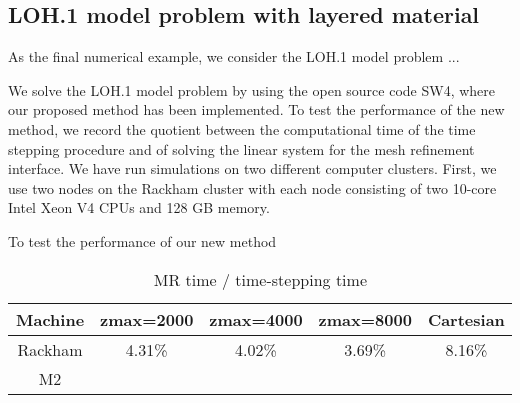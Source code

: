 \subsection{LOH.1 model problem with layered material}
As the final numerical example, we consider the LOH.1 model problem ...

We solve the LOH.1 model problem by using the open source code SW4, where our proposed method has been implemented. To test the performance of the new method, we record the quotient between the computational time of the time stepping procedure  and of  solving the linear system for the mesh refinement interface. We have run simulations on two different computer clusters. First, we use two nodes on the Rackham cluster with each node consisting of two 10-core Intel Xeon V4 CPUs and 128 GB memory. 

To test the performance of our new method
\begin{table}[htbp]
	\begin{center}
		\begin{tabular}{|c|c c c|c|}
			\hline
			Machine   & zmax=2000& zmax=4000 & zmax=8000 & Cartesian \\
			\hline
			Rackham & 4.31\% &  4.02\%& 3.69\%  & 8.16\%\\
			\hline
			M2 & &  & &\\
			\hline 
		\end{tabular}
	\end{center}
		\caption{MR time / time-stepping time}
\end{table} 
